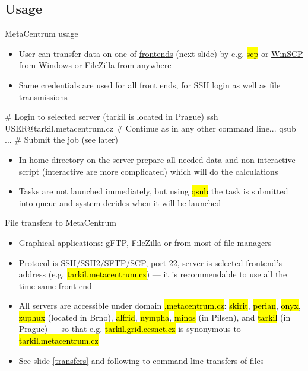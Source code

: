 \documentclass[compress, ucs, xelatex, 11pt, xcolor=svgnames, aspectratio=169,
	hyperref={
		bookmarks=true,
		unicode=true,
		colorlinks=true,
		pdftitle={Linux, command line and MetaCentrum},
		plainpages=false,
		pdfauthor={Vojtech Zeisek},
		pdfsubject={Course about use of Linux command line, writing shell scripts and using MetaCentrum of CESNET},
		pdfcreator={XeLaTeX},
		pdfkeywords={Linux, GNU, BASH, shell, command line, MetaCentrum},
		linkcolor=DarkRed, %
		anchorcolor=DarkBlue, %
		citecolor=Indigo, %
		filecolor=NavyBlue, %
		menucolor=DarkMagenta, %
		urlcolor=DarkBlue, %
		pdftex},
	url={hyphens, lowtilde} %
	]{beamer}
\renewcommand{\texttt}[1]{\hl{\ttfamily #1}}
\begin{document}
\subsection{Usage}

\begin{frame}[fragile]{MetaCentrum usage}
	\begin{itemize}
		\item User can transfer data on one of \href{https://wiki.metacentrum.cz/wiki/Frontend}{frontends} (next slide) by e.g. \texttt{scp} or \href{https://winscp.net/}{WinSCP} from Windows or \href{https://filezilla-project.org/}{FileZilla} from anywhere
		\item Same credentials are used for all front ends, for SSH login as well as file transmissions
	\end{itemize}
	\vfill
	\begin{bashcode}
    # Login to selected server (tarkil is located in Prague)
    ssh USER@tarkil.metacentrum.cz
    # Continue as in any other command line...
    qsub ... # Submit the job (see later)
	\end{bashcode}
	\vfill
	\begin{itemize}
		\item In home directory on the server prepare all needed data and non-interactive script (interactive are more complicated) which will do the calculations
		\item Tasks are not launched immediately, but using \texttt{qsub} the task is submitted into queue and system decides when it will be launched
	\end{itemize}
\end{frame}

\begin{frame}{File transfers to MetaCentrum}
	\begin{itemize}
		\item Graphical applications: \href{https://www.gftp.org/}{gFTP}, \href{https://filezilla-project.org/}{FileZilla} or from most of file managers
		\item Protocol is SSH/SSH2/SFTP/SCP, port 22, server is selected \href{https://wiki.metacentrum.cz/wiki/Frontend}{frontend's} address (e.g. \texttt{tarkil.metacentrum.cz}) --- it is recommendable to use all the time same front end
		\item All servers are accessible under domain \texttt{*.metacentrum.cz}: \texttt{skirit}, \texttt{perian}, \texttt{onyx}, \texttt{zuphux} (located in Brno), \texttt{alfrid}, \texttt{nympha}, \texttt{minos} (in Pilsen), and \texttt{tarkil} (in Prague) --- so that e.g. \texttt{tarkil.grid.cesnet.cz} is synonymous to \texttt{tarkil.metacentrum.cz}
		\item See slide \ref{transfers} and following to command-line transfers of files
	\end{itemize}
	\texttt{[image: gftp.png]}
\end{frame}
\end{document}
